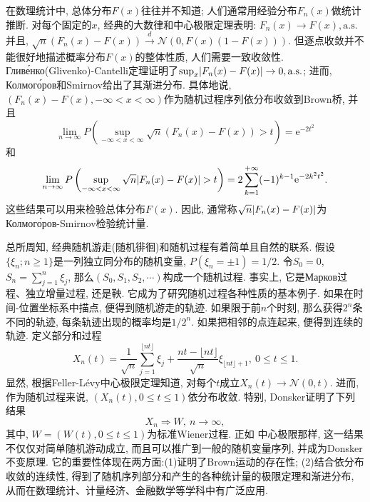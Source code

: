 在数理统计中, 总体分布$F(x)$往往并不知道; 人们通常用经验分布$F_n(x)$做统计推断. 对每个固定的$x$, 经典的大数律和中心极限定理表明: $F_n(x)\to F(x),\mathrm{a.s.}$并且, $\sqrt{n}(F_n(x)-F(x))\stackrel{d}{\rightarrow}\mathcal{N}(0,F(x)(1-F(x)))$. 但逐点收敛并不能很好地描述概率分布$F(x)$的整体性质, 人们需要一致收敛性. Гливе́нко(Glivenko)-Cantelli定理证明了$\sup_x\lvert F_n(x)-F(x)\rvert\to 0,\mathrm{a.s.}$; 进而, Колмого́ров和Smirnov给出了其渐进分布. 具体地说, $(F_n(x)-F(x),-\infty<x<\infty)$作为随机过程序列依分布收敛到Brown桥, 并且\begin{equation}\label{eq:A45}
\lim_{n\to\infty}P\left( \sup_{-\infty<x<\infty}\sqrt{n}(F_n(x)-F(x))>t \right) = \mathrm{e}^{-2t^2}
\end{equation}
和\begin{equation}\label{eq:A46}
\lim_{n\to\infty}P\left( \sup_{-\infty<x<\infty}\sqrt{n}\lvert F_n(x)-F(x)\rvert>t \right) = 2\sum_{k = 1}^{+\infty}(-1)^{k-1}\mathrm{e}^{-2k^2t^2}.
\end{equation}
这些结果可以用来检验总体分布$F(x)$. 因此, 通常称$\sqrt{n}\lvert F_n(x)-F(x)\rvert$为Колмого́ров-Smirnov检验统计量.

总所周知, 经典随机游走(随机徘徊)和随机过程有着简单且自然的联系. 假设$\{\xi_n;n\geqslant 1\}$是一列独立同分布的随机变量, $P(\xi_n=\pm 1) = 1/2$. 令$S_0 = 0$, $S_n = \sum_{j=1}^n\xi_j$, 那么$(S_0,S_1,S_2,\cdots)$构成一个随机过程. 事实上, 它是Марков过程、独立增量过程, 还是鞅. 它成为了研究随机过程各种性质的基本例子. 如果在时间-位置坐标系中描点, 便得到随机游走的轨迹. 如果限于前$n$个时刻, 那么获得$2^n$条不同的轨迹, 每条轨迹出现的概率均是$1/2^n$.  如果把相邻的点连起来, 便得到连续的轨迹. 定义部分和过程
\begin{equation}\label{eq:A47}
X_n(t) = \frac{1}{\sqrt{n}}\sum_{j = 1}^{\lfloor nt\rfloor}\xi_j + \frac{nt-\lfloor nt\rfloor}{\sqrt{n}}\xi_{\lfloor nt\rfloor+1},~0\leqslant t\leqslant 1.
\end{equation}
显然, 根据Feller-Lévy中心极限定理知道, 对每个$t$成立$X_n(t)\to \mathcal{N}(0,t)$. 进而, 作为随机过程来说, $(X_n(t),0\leqslant t\leqslant 1)$依分布收敛. 特别, Donsker证明了下列结果
\begin{equation}\label{eq:A48}
X_n\Rightarrow W,~n\to\infty,
\end{equation}
其中, $W = (W(t),0\leqslant t\leqslant 1)$为标准Wiener过程. 正如
中心极限那样, 这一结果不仅仅对简单随机游动成立, 而且可以推广到一般的随机变量序列, 并成为Donsker不变原理. 它的重要性体现在两方面:(1)证明了Brown运动的存在性; (2)结合依分布收敛的连续性, 得到了随机序列部分和产生的各种统计量的极限定理和渐进分布, 从而在数理统计、计量经济、金融数学等学科中有广泛应用.

